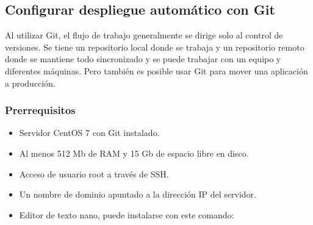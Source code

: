 \subsection{Configurar despliegue automático con Git}
Al utilizar Git, el flujo de trabajo generalmente se dirige solo al control de versiones. Se tiene un repositorio local donde se trabaja y un repositorio remoto donde se mantiene todo sincronizado y se puede trabajar con un equipo y diferentes máquinas. Pero también es posible usar Git para mover una aplicación a producción.
\vspace{0.8cm}

\subsubsection{Prerrequisitos}

\begin{itemize}
  \item Servidor CentOS 7 con Git instalado.
  \item Al menos 512 Mb de RAM y 15 Gb de espacio libre en disco.
  \item Acceso de usuario root a través de SSH.
  \item Un nombre de dominio apuntado a la dirección IP del servidor.
  \item Editor de texto nano, puede instalarse con este comando:\\

\end{itemize}